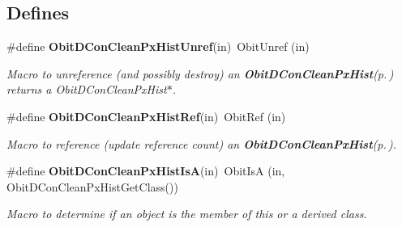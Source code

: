 \subsection*{Defines}
\begin{CompactItemize}
\item 
\#define {\bf Obit\-DCon\-Clean\-Px\-Hist\-Unref}(in)\ Obit\-Unref (in)
\begin{CompactList}\small\item\em Macro to unreference (and possibly destroy) an {\bf Obit\-DCon\-Clean\-Px\-Hist}{\rm (p.\,\pageref{structObitDConCleanPxHist})} returns a Obit\-DCon\-Clean\-Px\-Hist$\ast$. \item\end{CompactList}\item 
\#define {\bf Obit\-DCon\-Clean\-Px\-Hist\-Ref}(in)\ Obit\-Ref (in)
\begin{CompactList}\small\item\em Macro to reference (update reference count) an {\bf Obit\-DCon\-Clean\-Px\-Hist}{\rm (p.\,\pageref{structObitDConCleanPxHist})}. \item\end{CompactList}\item 
\#define {\bf Obit\-DCon\-Clean\-Px\-Hist\-Is\-A}(in)\ Obit\-Is\-A (in, Obit\-DCon\-Clean\-Px\-Hist\-Get\-Class())
\begin{CompactList}\small\item\em Macro to determine if an object is the member of this or a derived class. \item\end{CompactList}\end{CompactItemize}
